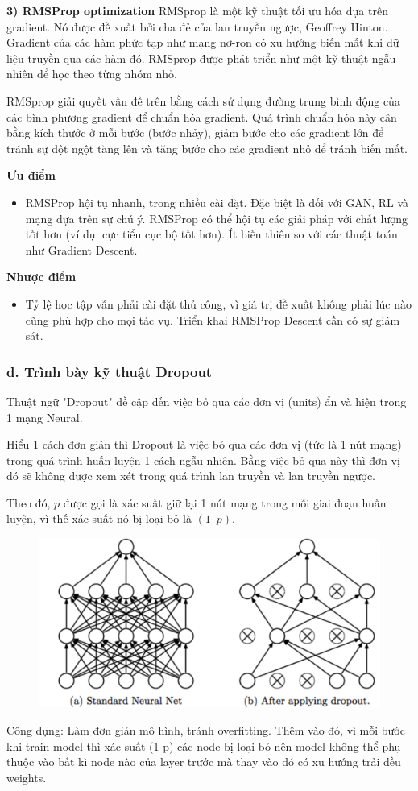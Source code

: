 \documentclass{article}
\begin{document}
	\textbf{3) RMSProp optimization} RMSprop là một kỹ thuật tối ưu hóa dựa trên gradient. Nó được đề xuất bởi cha đẻ của lan truyền ngược, Geoffrey Hinton. Gradient của các hàm phức tạp như mạng nơ-ron có xu hướng biến mất khi dữ liệu truyền qua các hàm đó. RMSprop được phát triển như một kỹ thuật ngẫu nhiên để học theo từng nhóm nhỏ.
	
	RMSprop giải quyết vấn đề trên bằng cách sử dụng đường trung bình động của các bình phương gradient để chuẩn hóa gradient. Quá trình chuẩn hóa này cân bằng kích thước ở mỗi bước (bước nhảy), giảm bước cho các gradient lớn để tránh sự đột ngột tăng lên và tăng bước cho các gradient nhỏ để tránh biến mất. 
	
	\textbf{Ưu điểm}
	\begin{itemize}
		\item RMSProp hội tụ nhanh, trong nhiều cài đặt. Đặc biệt là đối với GAN, RL và mạng dựa trên sự chú ý. RMSProp có thể hội tụ các giải pháp với chất lượng tốt hơn (ví dụ: cực tiểu cục bộ tốt hơn). Ít biến thiên so với các thuật toán như Gradient Descent.
	\end{itemize}
	\textbf{Nhược điểm}
	\begin{itemize}
		\item Tỷ lệ học tập vẫn phải cài đặt thủ công, vì giá trị đề xuất không phải lúc nào cũng phù hợp cho mọi tác vụ. Triển khai RMSProp Descent cần có sự giám sát.
	\end{itemize}
	
	\subsubsection{d. Trình bày kỹ thuật Dropout}
	\qquad Thuật ngữ "Dropout" đề cập đến việc bỏ qua các đơn vị (units) ẩn và hiện trong 1 mạng Neural.
	
	Hiểu 1 cách đơn giản thì Dropout là việc bỏ qua các đơn vị (tức là 1 nút mạng) trong quá trình huấn luyện 1 cách ngẫu nhiên. Bằng việc bỏ qua này thì đơn vị đó sẽ không được xem xét trong quá trình lan truyền và lan truyền ngược.
	
	Theo đó, $p$ được gọi là xác suất giữ lại 1 nút mạng trong mỗi giai đoạn huấn luyện, vì thế xác suất nó bị loại bỏ là $(1 – p)$.
	\begin{figure}[H]
		\centering
		\includegraphics[width=0.75\linewidth]{images/a5_7.png}
		\label{fig:writing-thesis}
	\end{figure}
	Công dụng: Làm đơn giản mô hình, tránh overfitting. Thêm vào đó, vì mỗi bước khi train model thì xác suất (1-p) các node bị loại bỏ nên model không thể phụ thuộc vào bất kì node nào của layer trước mà thay vào đó có xu hướng trải đều weights. 
	
\end{document}
